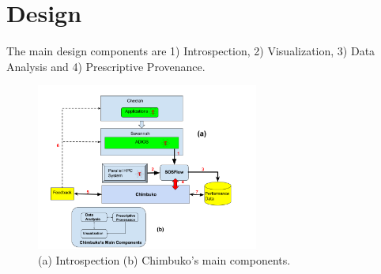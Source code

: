 \section{Design}
The main design components are 1) Introspection, 2) Visualization, 3) Data Analysis and 4) Prescriptive  Provenance. 

\begin{figure}[th!]
 \centering
  \includegraphics[width=0.65\textwidth]{Figs/Online_Chimbuko}
 \caption{(a) Introspection (b) Chimbuko's main components.}
\label{designfig:1}     
 \end{figure}


